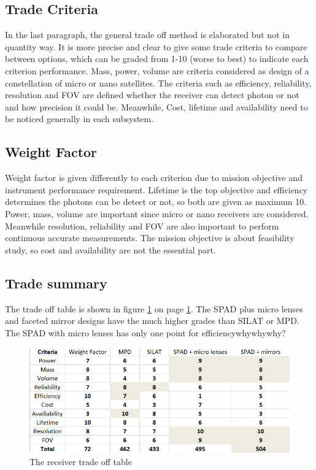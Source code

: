 \subsection{Trade Criteria}
\label{TOReceiverC}
In the last paragraph, the general trade off method is elaborated but not in quantity way. It is more precise and clear to give some trade criteria to compare between options, which can be graded from 1-10 (worse to best) to indicate each criterion performance. Mass, power, volume are criteria considered as design of a constellation of micro or nano satellites. The criteria such as efficiency, reliability, resolution and \ac{FOV} are defined whether the receiver can detect photon or not and how precision it could be. Meanwhile, Cost, lifetime and availability need to be noticed generally in each subsystem.

\subsection{Weight Factor}
\label{TOReceiverWF}
Weight factor is given differently to each criterion due to mission objective and instrument performance requirement. Lifetime is the top objective and efficiency determines the photons can be detect or not, so both are given as maximum 10. Power, mass, volume are important since micro or nano receivers are considered. Meanwhile resolution, reliability and \acs{FOV} are also important to perform continuous accurate measurements. The mission objective is about feasibility study, so cost and availability are not the essential part.

\subsection{Trade summary}
\label{TOReceiverS}
The trade off table is shown in figure \ref{fig:receiver_tradeoff} on page \ref{fig:receiver_tradeoff}. The \acs{SPAD} plus micro lenses and faceted mirror designs have the much higher grades than \acs{SILAT} or \acs{MPD}. The \acs{SPAD} with micro lenses has only one point for efficiencywhywhywhy?
\begin{figure}
\centering
\includegraphics[scale = 1]{chapters/img/Receiver_tradeoff.png}
\caption{The receiver trade off table}
\label{fig:receiver_tradeoff}
\end{figure}
